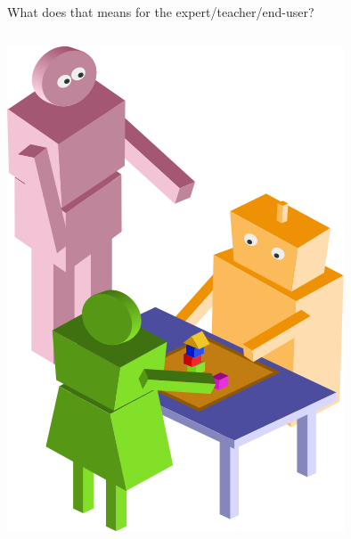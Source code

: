 \documentclass[xcolor=table]{beamer}
\begin{document}

\begin{frame}{What does that means for the expert/teacher/end-user?}

    \begin{columns}
        \begin{column}{0.45\linewidth}
            
            \begin{center}
                \includegraphics[width=0.9\linewidth]{sparc/sparc}
            \end{center}
        \end{column}
        \begin{column}{0.55\linewidth}
\end{column}
\end{columns}
\end{frame}
\end{document}
